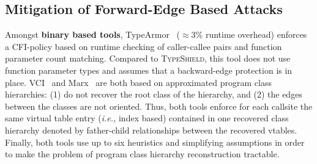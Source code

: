 \subsection{Mitigation of Forward-Edge Based Attacks}
\label{C++ Indirect Calls in Practice}
Amongst \textbf{binary based tools}, TypeArmor~\cite{veen:typearmor}
($\approx$3\% runtime overhead) enforces a CFI-policy based on runtime checking of caller-callee pairs 
and function parameter count matching. Compared to \textsc{TypeShield}, this tool does not use function 
parameter types and assumes that a backward-edge protection is in place.
VCI~\cite{vci:asiaccs} and Marx~\cite{marx} are both based on approximated program class hierarchies: 
(1) do not recover the root class of the hierarchy, and (2) the edges between the classes are not oriented. Thus, both tools 
enforce for each callsite the same virtual table entry (\textit{i.e.,} index based) 
contained in one recovered class hierarchy denoted by father-child relationships between the recovered vtables. 
Finally, both tools use up to six heuristics and simplifying assumptions in order to make the problem of program
class hierarchy reconstruction tractable.

